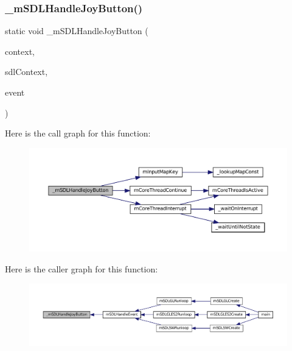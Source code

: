 \subsubsection{\texorpdfstring{\+\_\+m\+S\+D\+L\+Handle\+Joy\+Button()}{\_mSDLHandleJoyButton()}}
{\footnotesize\ttfamily static void \+\_\+m\+S\+D\+L\+Handle\+Joy\+Button (\begin{DoxyParamCaption}\item[{struct m\+Core\+Thread $\ast$}]{context,  }\item[{struct \mbox{\hyperlink{sdl-events_8h_structm_s_d_l_player}{m\+S\+D\+L\+Player}} $\ast$}]{sdl\+Context,  }\item[{const struct S\+D\+L\+\_\+\+Joy\+Button\+Event $\ast$}]{event }\end{DoxyParamCaption})\hspace{0.3cm}{\ttfamily [static]}}

Here is the call graph for this function\+:
\nopagebreak
\begin{figure}[H]
\begin{center}
\leavevmode
\includegraphics[width=350pt]{sdl-events_8c_a8b984affb2018edd5d8ec595f566921c_cgraph}
\end{center}
\end{figure}
Here is the caller graph for this function\+:
\nopagebreak
\begin{figure}[H]
\begin{center}
\leavevmode
\includegraphics[width=350pt]{sdl-events_8c_a8b984affb2018edd5d8ec595f566921c_icgraph}
\end{center}
\end{figure}
\mbox{\label{sdl-events_8c_a67374fa271dc2b13d5f8ec2d42d2d0ce}} 
